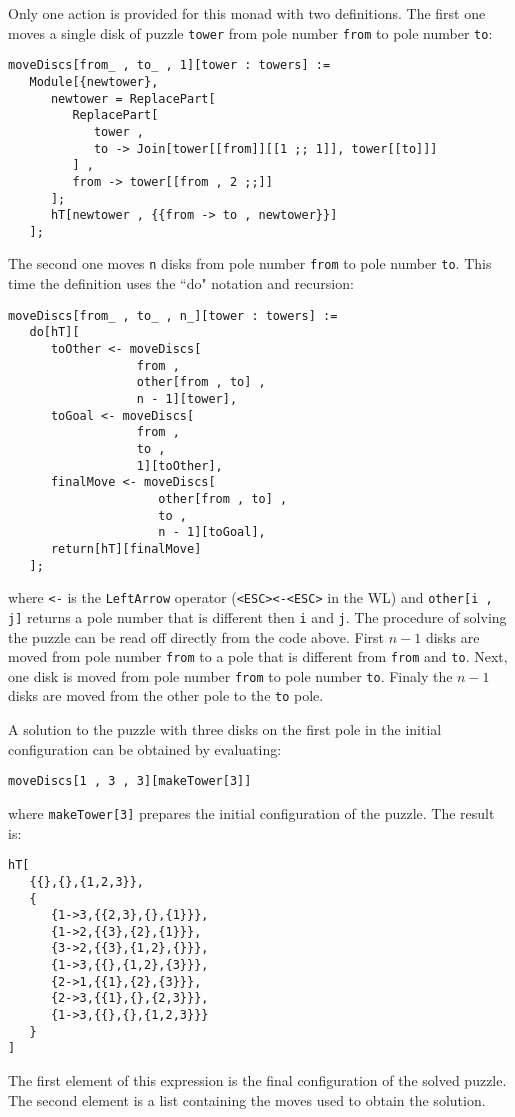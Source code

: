 \documentclass[smallextended]{svjour3}
\begin{document}
Only one action is provided for this monad with two definitions. 
The first one moves a single disk
of puzzle \verb|tower| from pole number \verb|from| to pole number \verb|to|:
\begin{lstlisting}
moveDiscs[from_ , to_ , 1][tower : towers] :=
   Module[{newtower},
      newtower = ReplacePart[
         ReplacePart[
            tower , 
            to -> Join[tower[[from]][[1 ;; 1]], tower[[to]]]
         ] , 
         from -> tower[[from , 2 ;;]]
      ];
      hT[newtower , {{from -> to , newtower}}]
   ];
\end{lstlisting}
The second one moves \verb|n| disks from pole number \verb|from|
to pole number \verb|to|. This time the definition uses the ``do" notation and recursion:
\begin{lstlisting}
moveDiscs[from_ , to_ , n_][tower : towers] :=
   do[hT][
      toOther <- moveDiscs[
                  from , 
                  other[from , to] , 
                  n - 1][tower],
      toGoal <- moveDiscs[
                  from , 
                  to , 
                  1][toOther],
      finalMove <- moveDiscs[
                     other[from , to] , 
                     to , 
                     n - 1][toGoal],
      return[hT][finalMove]
   ];
\end{lstlisting}
where \verb|<-| is the \verb|LeftArrow| operator (\verb|<ESC><-<ESC>| in the WL) 
and \verb|other[i , j]| returns a pole number
that is different then \verb|i| and \verb|j|. The procedure
of solving the puzzle can be read off directly from the code above.
First $n-1$ disks are moved from pole number \verb|from| to a pole that is
different from \verb|from| and \verb|to|. Next, one disk is moved from pole
number \verb|from| to pole number \verb|to|. Finaly the $n-1$ disks are moved
from the other pole to the \verb|to| pole.

A solution to the puzzle with three disks on the first pole in the initial
configuration
can be obtained by evaluating:
\begin{lstlisting}
moveDiscs[1 , 3 , 3][makeTower[3]]
\end{lstlisting}
where \verb|makeTower[3]| prepares the initial configuration of the puzzle.
The result is:
\begin{lstlisting}
hT[
   {{},{},{1,2,3}},
   {
      {1->3,{{2,3},{},{1}}},
      {1->2,{{3},{2},{1}}},
      {3->2,{{3},{1,2},{}}},
      {1->3,{{},{1,2},{3}}},
      {2->1,{{1},{2},{3}}},
      {2->3,{{1},{},{2,3}}},
      {1->3,{{},{},{1,2,3}}}
   }
]
\end{lstlisting}
The first element of this expression is the final configuration of the solved
puzzle. The second element is a list containing the moves used to obtain the
solution. 
\end{document}
